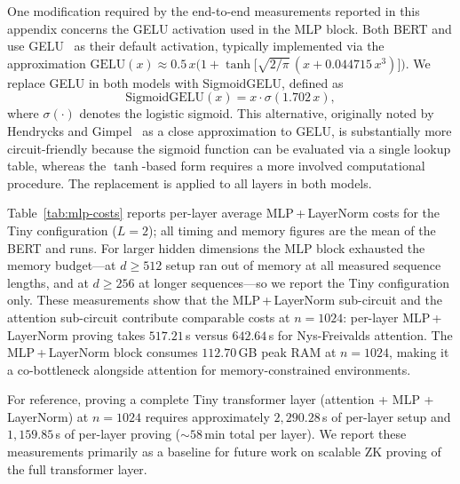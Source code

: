 One modification required by the end-to-end measurements reported in this appendix concerns the GELU activation used in the MLP block. Both BERT and \nystromformer use GELU~\cite{GELU} as their default activation, typically implemented via the approximation $\text{GELU}(x) \approx 0.5\,x\bigl(1 + \tanh\bigl[\sqrt{2/\pi}\,(x + 0.044715\,x^3)\bigr]\bigr)$.
We replace GELU in both models with SigmoidGELU, defined as
\[
    \text{SigmoidGELU}(x) = x \cdot \sigma(1.702\,x),
\]
where $\sigma(\cdot)$ denotes the logistic sigmoid. This alternative, originally noted by Hendrycks and Gimpel~\cite{GELU} as a close approximation to GELU, is substantially more circuit-friendly because the sigmoid function can be evaluated via a single lookup table, whereas the $\tanh$-based form requires a more involved computational procedure. The replacement is applied to all layers in both models.

Table~\ref{tab:mlp-costs} reports per-layer average MLP\,+\,LayerNorm costs for the Tiny configuration ($L{=}2$); all timing and memory figures are the mean of the BERT and \nystrom runs.
For larger hidden dimensions the MLP block exhausted the memory budget---at $d{\geq}512$ setup ran out of memory at all measured sequence lengths, and at $d{\geq}256$ at longer sequences---so we report the Tiny configuration only.
These measurements show that the MLP\,+\,LayerNorm sub-circuit and the attention sub-circuit contribute comparable costs at $n{=}1024$: per-layer MLP\,+\,LayerNorm proving takes $517.21$\,s versus $642.64$\,s for Nys-Freivalds attention. The MLP\,+\,LayerNorm block consumes $112.70$\,GB peak RAM at $n{=}1024$, making it a co-bottleneck alongside attention for memory-constrained environments.

For reference, proving a complete Tiny transformer layer (attention + MLP + LayerNorm) at $n{=}1024$ requires approximately $2{,}290.28$\,s of per-layer setup and $1{,}159.85$\,s of per-layer proving (${\sim}58$\,min total per layer). We report these measurements primarily as a baseline for future work on scalable ZK proving of the full transformer layer.

